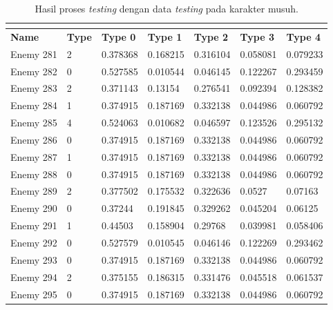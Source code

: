 \begin{longtable}{|l|l|l|l|l|l|l|}
	\caption{Hasil proses \textit{testing} dengan data \textit{testing} pada karakter musuh.}
	\vspace{1ex}
	\label{tb:enemy_valid_result}\\
	\hline
	\rowcolor[HTML]{C0C0C0} 
	\textbf{Name} & \textbf{Type} & \textbf{Type 0} & \textbf{Type 1} & \textbf{Type 2} & \textbf{Type 3} & \textbf{Type 4} \\ \hline
	Enemy 281 & 2 & 0.378368 & {\color[HTML]{FE0000} 0.168215} & 0.316104 & 0.058081 & 0.079233 \\ \hline
	Enemy 282 & 0 & {\color[HTML]{FE0000} 0.527585} & 0.010544 & 0.046145 & 0.122267 & 0.293459 \\ \hline
	Enemy 283 & 2 & 0.371143 & 0.13154 & {\color[HTML]{FE0000} 0.276541} & 0.092394 & 0.128382 \\ \hline
	Enemy 284 & 1 & 0.374915 & {\color[HTML]{FE0000} 0.187169} & 0.332138 & 0.044986 & 0.060792 \\ \hline
	Enemy 285 & 4 & 0.524063 & 0.010682 & 0.046597 & 0.123526 & {\color[HTML]{FE0000} 0.295132} \\ \hline
	Enemy 286 & 0 & {\color[HTML]{009901} 0.374915} & 0.187169 & 0.332138 & 0.044986 & 0.060792 \\ \hline
	Enemy 287 & 1 & 0.374915 & {\color[HTML]{FE0000} 0.187169} & 0.332138 & 0.044986 & 0.060792 \\ \hline
	Enemy 288 & 0 & {\color[HTML]{FE0000} 0.374915} & 0.187169 & 0.332138 & 0.044986 & 0.060792 \\ \hline
	Enemy 289 & 2 & 0.377502 & 0.175532 & {\color[HTML]{FE0000} 0.322636} & 0.0527 & 0.07163 \\ \hline
	Enemy 290 & 0 & {\color[HTML]{009901} 0.37244} & 0.191845 & 0.329262 & 0.045204 & 0.06125 \\ \hline
	Enemy 291 & 1 & 0.44503 & {\color[HTML]{FE0000} 0.158904} & 0.29768 & 0.039981 & 0.058406 \\ \hline
	Enemy 292 & 0 & {\color[HTML]{009901} 0.527579} & 0.010545 & 0.046146 & 0.122269 & 0.293462 \\ \hline
	Enemy 293 & 0 & {\color[HTML]{009901} 0.374915} & 0.187169 & 0.332138 & 0.044986 & 0.060792 \\ \hline
	Enemy 294 & 2 & 0.375155 & 0.186315 & {\color[HTML]{FE0000} 0.331476} & 0.045518 & 0.061537 \\ \hline
	Enemy 295 & 0 & {\color[HTML]{009901} 0.374915} & 0.187169 & 0.332138 & 0.044986 & 0.060792 \\ \hline

\end{longtable}
